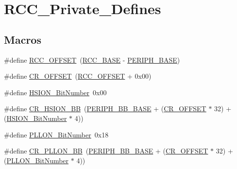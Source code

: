 \hypertarget{group___r_c_c___private___defines}{}\section{R\+C\+C\+\_\+\+Private\+\_\+\+Defines}
\label{group___r_c_c___private___defines}
\subsection*{Macros}
\begin{DoxyCompactItemize}
\item 
\#define \mbox{\hyperlink{group___r_c_c___private___defines_ga539e07c3b3c55f1f1d47231341fb11e1}{R\+C\+C\+\_\+\+O\+F\+F\+S\+ET}}~(\mbox{\hyperlink{group___peripheral__memory__map_ga0e681b03f364532055d88f63fec0d99d}{R\+C\+C\+\_\+\+B\+A\+SE}} -\/ \mbox{\hyperlink{group___peripheral__memory__map_ga9171f49478fa86d932f89e78e73b88b0}{P\+E\+R\+I\+P\+H\+\_\+\+B\+A\+SE}})
\item 
\#define \mbox{\hyperlink{group___r_c_c___private___defines_gafa1d3d0ea72132df651c76fc1bdffffc}{C\+R\+\_\+\+O\+F\+F\+S\+ET}}~(\mbox{\hyperlink{group___r_c_c___private___defines_ga539e07c3b3c55f1f1d47231341fb11e1}{R\+C\+C\+\_\+\+O\+F\+F\+S\+ET}} + 0x00)
\item 
\#define \mbox{\hyperlink{group___r_c_c___private___defines_ga3d3085e491cbef815d223afbe5bf1930}{H\+S\+I\+O\+N\+\_\+\+Bit\+Number}}~0x00
\item 
\#define \mbox{\hyperlink{group___r_c_c___private___defines_gac3290a833c0e35ec17d32c2d494e6133}{C\+R\+\_\+\+H\+S\+I\+O\+N\+\_\+\+BB}}~(\mbox{\hyperlink{group___peripheral__memory__map_gaed7efc100877000845c236ccdc9e144a}{P\+E\+R\+I\+P\+H\+\_\+\+B\+B\+\_\+\+B\+A\+SE}} + (\mbox{\hyperlink{group___r_c_c___private___defines_gafa1d3d0ea72132df651c76fc1bdffffc}{C\+R\+\_\+\+O\+F\+F\+S\+ET}} $\ast$ 32) + (\mbox{\hyperlink{group___r_c_c___private___defines_ga3d3085e491cbef815d223afbe5bf1930}{H\+S\+I\+O\+N\+\_\+\+Bit\+Number}} $\ast$ 4))
\item 
\#define \mbox{\hyperlink{group___r_c_c___private___defines_gab24d7f5f8e4b3b717fd91b54f393f6a3}{P\+L\+L\+O\+N\+\_\+\+Bit\+Number}}~0x18
\item 
\#define \mbox{\hyperlink{group___r_c_c___private___defines_ga3f1fb2589cb8b5ac2f7121aba1135a5f}{C\+R\+\_\+\+P\+L\+L\+O\+N\+\_\+\+BB}}~(\mbox{\hyperlink{group___peripheral__memory__map_gaed7efc100877000845c236ccdc9e144a}{P\+E\+R\+I\+P\+H\+\_\+\+B\+B\+\_\+\+B\+A\+SE}} + (\mbox{\hyperlink{group___r_c_c___private___defines_gafa1d3d0ea72132df651c76fc1bdffffc}{C\+R\+\_\+\+O\+F\+F\+S\+ET}} $\ast$ 32) + (\mbox{\hyperlink{group___r_c_c___private___defines_gab24d7f5f8e4b3b717fd91b54f393f6a3}{P\+L\+L\+O\+N\+\_\+\+Bit\+Number}} $\ast$ 4))

\end{DoxyCompactItemize}
